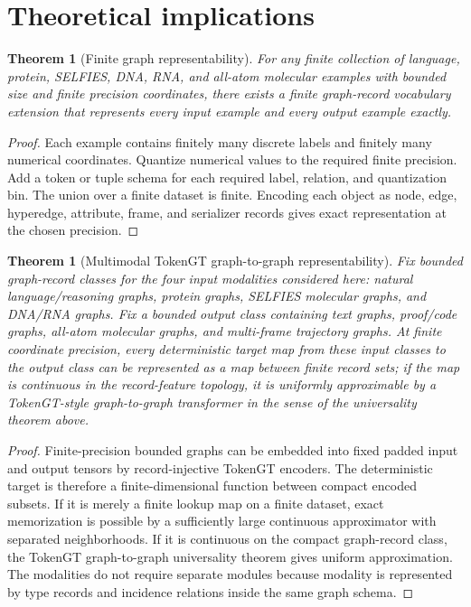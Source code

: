 \documentclass[11pt]{article}
\newtheorem{theorem}[definition]{Theorem}
\newcommand{\1}{\mathbf{1}}
\begin{document}
\section{Theoretical implications}

\begin{theorem}[Finite graph representability]
For any finite collection of language, protein, SELFIES, DNA, RNA, and all-atom molecular examples with bounded size and finite precision coordinates, there exists a finite graph-record vocabulary extension that represents every input example and every output example exactly.
\end{theorem}
\begin{proof}
Each example contains finitely many discrete labels and finitely many numerical coordinates. Quantize numerical values to the required finite precision. Add a token or tuple schema for each required label, relation, and quantization bin. The union over a finite dataset is finite. Encoding each object as node, edge, hyperedge, attribute, frame, and serializer records gives exact representation at the chosen precision.
\end{proof}

\begin{theorem}[Multimodal TokenGT graph-to-graph representability]
Fix bounded graph-record classes for the four input modalities considered here: natural language/reasoning graphs, protein graphs, SELFIES molecular graphs, and DNA/RNA graphs. Fix a bounded output class containing text graphs, proof/code graphs, all-atom molecular graphs, and multi-frame trajectory graphs. At finite coordinate precision, every deterministic target map from these input classes to the output class can be represented as a map between finite record sets; if the map is continuous in the record-feature topology, it is uniformly approximable by a TokenGT-style graph-to-graph transformer in the sense of the universality theorem above.
\end{theorem}
\begin{proof}
Finite-precision bounded graphs can be embedded into fixed padded input and output tensors by record-injective TokenGT encoders. The deterministic target is therefore a finite-dimensional function between compact encoded subsets. If it is merely a finite lookup map on a finite dataset, exact memorization is possible by a sufficiently large continuous approximator with separated neighborhoods. If it is continuous on the compact graph-record class, the TokenGT graph-to-graph universality theorem gives uniform approximation. The modalities do not require separate modules because modality is represented by type records and incidence relations inside the same graph schema.
\end{proof}
\end{document}
